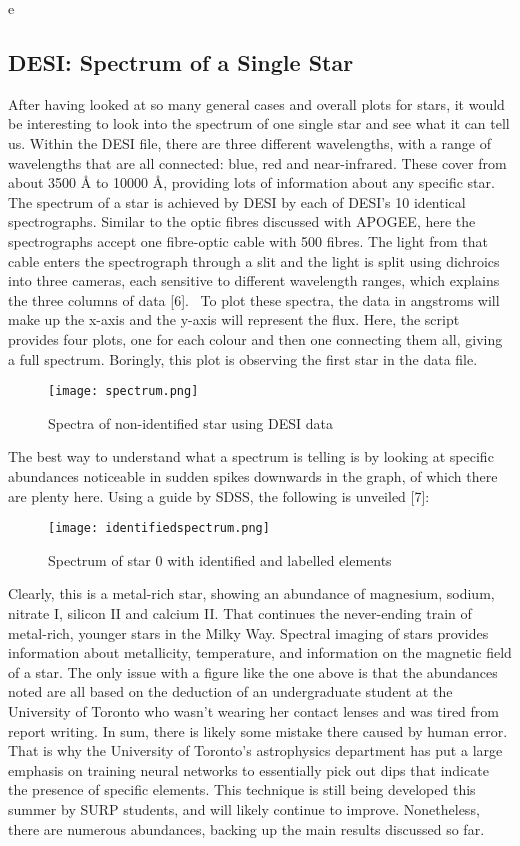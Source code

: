 e\documentclass{article}
\begin{document}
\subsection*{DESI: Spectrum of a Single Star}
\indent After having looked at so many general cases and overall plots for stars, it would be interesting to look into the spectrum of one single star and see what it can tell us. Within the DESI file, there are three different wavelengths, with a range of wavelengths that are all connected: blue, red and near-infrared. These cover from about 3500 Å to 10000 Å, providing lots of information about any specific star. The spectrum of a star is achieved by DESI by each of DESI’s 10 identical spectrographs. Similar to the optic fibres discussed with APOGEE, here the spectrographs accept one fibre-optic cable with 500 fibres. The light from that cable enters the spectrograph through a slit and the light is split using dichroics into three cameras, each sensitive to different wavelength ranges, which explains the three columns of data [6].  To plot these spectra, the data in angstroms will make up the x-axis and the y-axis will represent the flux. Here, the script provides four plots, one for each colour and then one connecting them all, giving a full spectrum. Boringly, this plot is observing the first star in the data file.\\
\begin{figure}[H]
    \centering
    \texttt{[image: spectrum.png]}
    \caption{Spectra of non-identified star using DESI data}
    \label{fig:5}
\end{figure}
\indent The best way to understand what a spectrum is telling is by looking at specific abundances noticeable in sudden spikes downwards in the graph, of which there are plenty here. Using a guide by SDSS, the following is unveiled [7]:
\begin{figure}[H]
    \centering
    \texttt{[image: identifiedspectrum.png]}
    \caption{Spectrum of star 0 with identified and labelled elements}
    \label{fig:enter-label}
\end{figure}
\indent Clearly, this is a metal-rich star, showing an abundance of magnesium, sodium, nitrate I, silicon II and calcium II. That continues the never-ending train of metal-rich, younger stars in the Milky Way. Spectral imaging of stars provides information about metallicity, temperature, and information on the magnetic field of a star. The only issue with a figure like the one above is that the abundances noted are all based on the deduction of an undergraduate student at the University of Toronto who wasn’t wearing her contact lenses and was tired from report writing. In sum, there is likely some mistake there caused by human error. That is why the University of Toronto's astrophysics department has put a large emphasis on training neural networks to essentially pick out dips that indicate the presence of specific elements. This technique is still being developed this summer by SURP students, and will likely continue to improve. Nonetheless,  there are numerous abundances, backing up the main results discussed so far.\\
\end{document}

